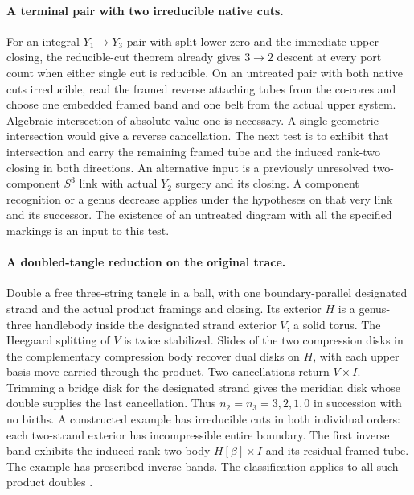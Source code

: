 \documentclass[11pt,letterpaper]{article}
\numberwithin{equation}{section}
\begin{document}
\paragraph{A terminal pair with two irreducible native cuts.}
For an integral \(Y_1\to Y_3\) pair with split lower zero and the
immediate upper closing, the reducible-cut theorem already gives
\(3\to2\) descent at every port count when either single cut is reducible.
On an untreated pair with both native cuts irreducible, read the
framed reverse attaching tubes from the co-cores and choose one
embedded framed band and one belt from the actual upper system.
Algebraic intersection of absolute value one is necessary. A single
geometric intersection would give a reverse cancellation. The next
test is to exhibit that intersection and carry the remaining framed
tube and the induced rank-two closing in both directions. An alternative
input is a previously unresolved two-component \(S^3\) link with
actual \(Y_2\) surgery and its closing. A component recognition or a
genus decrease applies under the hypotheses on that very link and
its successor. The existence of an untreated diagram with all the
specified markings is an input to this test.

\paragraph{A doubled-tangle reduction on the original trace.}
Double a free three-string tangle in a ball, with one boundary-parallel
designated strand and the actual product framings and closing. Its
exterior \(H\) is a genus-three handlebody inside the designated
strand exterior \(V\), a solid torus. The Heegaard splitting of \(V\)
is twice stabilized. Slides of the two compression disks in the
complementary compression body recover dual disks on \(H\), with
each upper basis move carried through the product. Two cancellations
return \(V\times I\). Trimming a bridge disk for the designated
strand gives the meridian disk whose double supplies the last cancellation. Thus \(n_2=n_3=3,2,1,0\) in
succession with no births. A constructed example has irreducible
cuts in both individual orders: each two-strand exterior has
incompressible entire boundary. The first inverse band exhibits the
induced rank-two body \(H[\beta]\times I\) and its residual framed tube.
The example has prescribed inverse bands. The classification applies
to all such product doubles \cite[\S4(3)]{Waldhausen1968Heegaard}%
\cite[Appendix B]{Bonahon1983Cobordism}%
\cite{Baker2026HandleCuts}.
\end{document}
